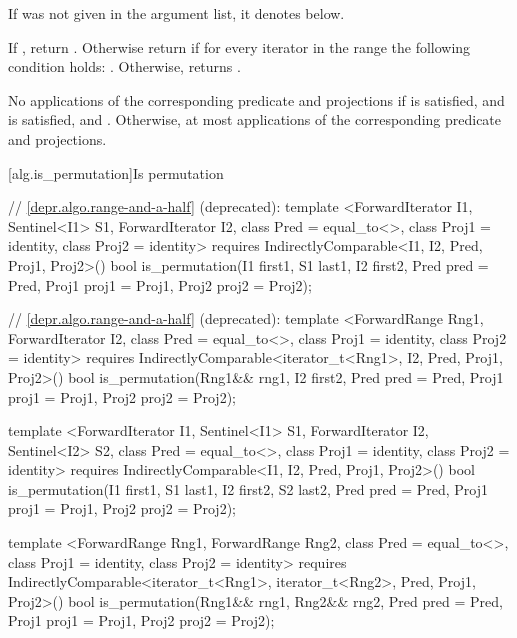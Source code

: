 \begin{itemdescr}
\pnum
\remarks If  was not given in the argument list, it denotes
 below.

\pnum
\returns
If
,
return
.
Otherwise return
if for every iterator
in the range 
the following condition holds:
.
Otherwise, returns
.

\pnum
\complexity
No applications of the corresponding predicate and projections if
 is satisfied, and
 is satisfied,
and
.
Otherwise, at most
applications of the corresponding predicate and projections.
\end{itemdescr}

[alg.is_permutation]{Is permutation}

%
\begin{itemdecl}
// \ref{depr.algo.range-and-a-half} (deprecated):
template <ForwardIterator I1, Sentinel<I1> S1, ForwardIterator I2,
    class Pred = equal_to<>, class Proj1 = identity, class Proj2 = identity>
  requires IndirectlyComparable<I1, I2, Pred, Proj1, Proj2>()
  bool is_permutation(I1 first1, S1 last1, I2 first2,
                      Pred pred = Pred{},
                      Proj1 proj1 = Proj1{}, Proj2 proj2 = Proj2{});

// \ref{depr.algo.range-and-a-half} (deprecated):
template <ForwardRange Rng1, ForwardIterator I2, class Pred = equal_to<>,
    class Proj1 = identity, class Proj2 = identity>
  requires IndirectlyComparable<iterator_t<Rng1>, I2, Pred, Proj1, Proj2>()
  bool is_permutation(Rng1&& rng1, I2 first2, Pred pred = Pred{},
                      Proj1 proj1 = Proj1{}, Proj2 proj2 = Proj2{});

template <ForwardIterator I1, Sentinel<I1> S1, ForwardIterator I2,
    Sentinel<I2> S2, class Pred = equal_to<>, class Proj1 = identity,
    class Proj2 = identity>
  requires IndirectlyComparable<I1, I2, Pred, Proj1, Proj2>()
  bool is_permutation(I1 first1, S1 last1, I2 first2, S2 last2,
                      Pred pred = Pred{},
                      Proj1 proj1 = Proj1{}, Proj2 proj2 = Proj2{});

template <ForwardRange Rng1, ForwardRange Rng2, class Pred = equal_to<>,
    class Proj1 = identity, class Proj2 = identity>
  requires IndirectlyComparable<iterator_t<Rng1>, iterator_t<Rng2>, Pred, Proj1, Proj2>()
  bool is_permutation(Rng1&& rng1, Rng2&& rng2, Pred pred = Pred{},
                      Proj1 proj1 = Proj1{}, Proj2 proj2 = Proj2{});
\end{itemdecl}

